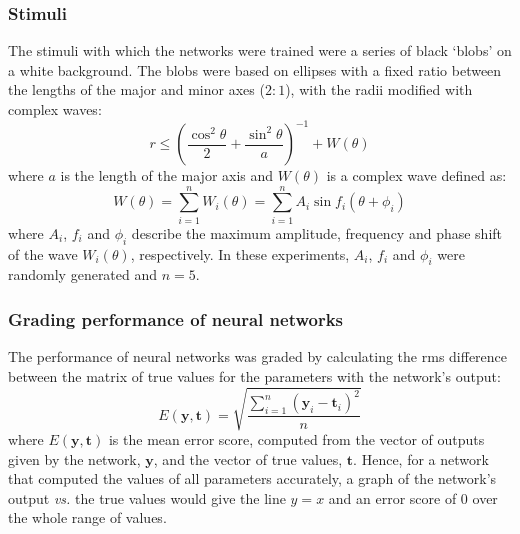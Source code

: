 \subsubsection*{Stimuli}
\label{sec:methods:stimuli}
The stimuli with which the networks were trained were a series of black `blobs' on a white background.
The blobs were based on ellipses with a fixed ratio between the lengths of the major and minor axes ($2:1$), with the radii modified with complex waves:
$$
r \le \left(\frac{\cos^2 \theta}{2} + \frac{\sin^2 \theta}{a} \right)^{-1} + W(\theta)
$$
where $a$ is the length of the major axis and $W(\theta)$ is a complex wave defined as:
$$
W(\theta) = \sum_{i=1}^n W_i(\theta) = \sum_{i=1}^n A_i \sin f_i (\theta+\phi_i) 
$$
where $A_i$, $f_i$ and $\phi_i$ describe the maximum amplitude, frequency and phase shift of the wave $W_i(\theta)$, respectively.
In these experiments, $A_i$, $f_i$ and $\phi_i$ were randomly generated and $n=5$.

\subsubsection*{Grading performance of neural networks}
The performance of neural networks was graded by calculating the \ac{rms} difference between the matrix of true values for the parameters with the network's output:
$$
E(\mathbf{y},\mathbf{t}) = \sqrt{\frac{\sum\limits_{i=1}^{n} (\mathbf{y}_i-\mathbf{t}_i)^2}{n}}
$$
where $E(\mathbf{y},\mathbf{t})$ is the mean error score, computed from the vector of outputs given by the network, $\mathbf{y}$, and the vector of true values, $\mathbf{t}$.
Hence, for a network that computed the values of all parameters accurately, a graph of the network's output \emph{vs.} the true values would give the line $y=x$ and an error score of 0 over the whole range of values.

